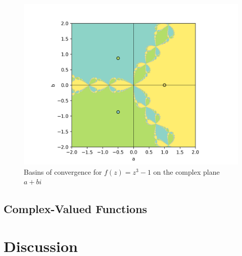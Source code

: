 \documentclass[10pt,a4paper]{article}
\begin{document}
		\begin{figure}[h]
			\caption{Basins of convergence for $f(z) = z^3 - 1$ on the complex plane $a+bi$}
			\includegraphics[scale=0.75]{figure4}
		\end{figure}
		
		\subsection{Complex-Valued Functions}
		
	\section{Discussion}
\end{document}
